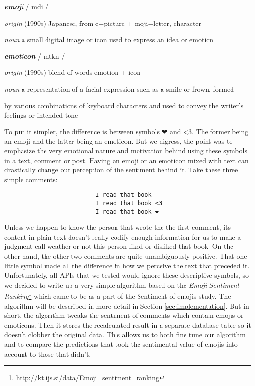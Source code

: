 \textbf{\emph{emoji}} 
/ \textsci \textprimstress m\textschwa \textupsilon d\textyogh i /
\begin{adjustwidth}{1cm}{}
\emph{origin}
(1990s) Japanese, from e=picture + moji=letter, character
\end{adjustwidth}
\begin{adjustwidth}{1cm}{}
\emph{noun}
a small digital image or icon used to express an idea or emotion
\end{adjustwidth}

\textbf{\emph{emoticon}}  
/ \textsci \textprimstress m\textschwa \textupsilon t\textsci k\textturnscripta n /
\begin{adjustwidth}{1cm}{}
\emph{origin}
(1990s) blend of words emotion + icon
\end{adjustwidth}
\begin{adjustwidth}{1cm}{}
\emph{noun}
a representation of a facial expression such as a smile or frown, formed 
\begin{adjustwidth}{1cm}{}
by various combinations of keyboard characters and used to convey the writer's feelings or intended tone
\end{adjustwidth}\end{adjustwidth}
To put it simpler, the difference is between symbols ❤ and \textless3. The former being an emoji and the latter being an emoticon. But we digress, the point was to emphasize the very emotional nature and motivation behind using these symbols in a text, comment or post. 
Having an emoji or an emoticon mixed with text can drastically change our perception of the sentiment behind it. Take these three simple comments: 
\begin{verbatim}
                          I read that book
                          I read that book <3
                          I read that book ❤
\end{verbatim}
Unless we happen to know the person that wrote the the first comment, its content in plain text doesn't really codify enough information for us to make a judgment call weather or not this person liked or disliked that book. On the other hand, the other two comments are quite unambiguously positive. 
That one little symbol made all the difference in how we perceive the text that preceded it. 
Unfortunately, all APIs that we tested would ignore these descriptive symbols, so we decided to write up a very simple algorithm based on the \emph{Emoji Sentiment Ranking}\footnote{http://kt.ijs.si/data/Emoji\_sentiment\_ranking} which came to be as a part of the Sentiment of emojis study\cite{Kralj2015emojis}.  
The algorithm will be described in more detail in Section \ref{sec:implementation}.
But in short, the algorithm tweaks the sentiment of comments which contain emojis or emoticons. 
Then it stores the recalculated result in a separate database table so it doesn't clobber the original data. 
This allows us to both fine tune our algorithm and to compare the predictions that took the sentimental value of emojis into account to those that didn't.

